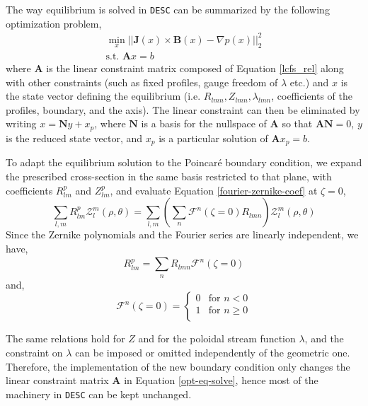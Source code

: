 \documentclass{jpp}
\begin{document}
The way equilibrium is solved in \texttt{DESC} can be summarized by the following optimization problem,
\begin{equation}
    \begin{split}
        \min_{x} ||\mathbf{J}(x)\times\mathbf{B}(x)-\nabla p(x)||_2^2 \\
        \text{s.t. } \mathbf{A}x = b 
    \end{split}
    \label{opt-eq-solve}
\end{equation}
where $\mathbf{A}$ is the linear constraint matrix composed of Equation \ref{lcfs_rel} along with other constraints (such as fixed profiles, gauge freedom of $\lambda$ etc.) and $x$ is the state vector defining the equilibrium (i.e. $R_{lmn}, Z_{lmn}, \lambda_{lmn}$, coefficients of the profiles, boundary, and the axis). The linear constraint can then be eliminated by writing $x = \mathbf{N}y + x_p$, where $\mathbf{N}$ is a basis for the nullspace of $\mathbf{A}$ so that $\mathbf{AN}=0$, $y$ is the reduced state vector, and $x_p$ is a particular solution of $\mathbf{A}x_p=b$.

To adapt the equilibrium solution to the Poincaré boundary condition, we expand the prescribed cross-section in the same basis restricted to that plane, with coefficients $R^p_{lm}$ and $Z^p_{lm}$, and evaluate Equation \ref{fourier-zernike-coef} at $\zeta=0$,
\begin{equation}
    \sum_{l, m}^{}R^p_{lm} \mathcal{Z}_l^{m} (\rho, \theta) =  \sum_{l, m}^{} \left( \sum_{n}^{} \mathcal{F}^n(\zeta=0) R_{lmn}  \right)  \mathcal{Z}_l^{m} (\rho, \theta)
\end{equation}
Since the Zernike polynomials and the Fourier series are linearly independent, we have,
\begin{equation}
    R^p_{lm} = \sum_{n}^{} R_{lmn} \mathcal{F}^n(\zeta=0)  \label{poincare-rel}
\end{equation}
and,
\begin{equation}
    \mathcal{F}^n(\zeta=0) = \begin{cases}
        0 & \text{for } n<0\\
        1 & \text{for } n\geq0\\
    \end{cases} \label{zeros-in-fourier}
\end{equation}

The same relations hold for $Z$ and for the poloidal stream function $\lambda$, and the constraint on $\lambda$ can be imposed or omitted independently of the geometric one. Therefore, the implementation of the new boundary condition only changes the linear constraint matrix $\mathbf{A}$ in Equation \ref{opt-eq-solve}, hence most of the machinery in \texttt{DESC} can be kept unchanged.
\end{document}
